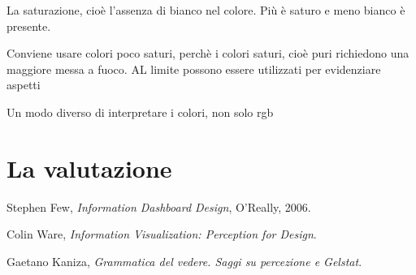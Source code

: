 \documentclass{ium}
\begin{document}
La saturazione, cioè l'assenza di bianco nel colore. Più è saturo e meno bianco è presente.

Conviene usare colori poco saturi, perchè i colori saturi, cioè puri richiedono una maggiore messa a fuoco. AL limite possono essere utilizzati per evidenziare aspetti

Un modo diverso di interpretare i colori, non solo rgb



\section{La valutazione}




%
%

\begin{thebibliography}{99}

  {\sc Stephen Few},
  {\em Information Dashboard Design},
  O'Really, 2006.

  {\sc Colin Ware},
  {\em Information Visualization: Perception for Design}.

  {\sc Gaetano Kaniza},
  {\em Grammatica del vedere. Saggi su percezione e Gelstat}.



\end{thebibliography}
\end{document}

